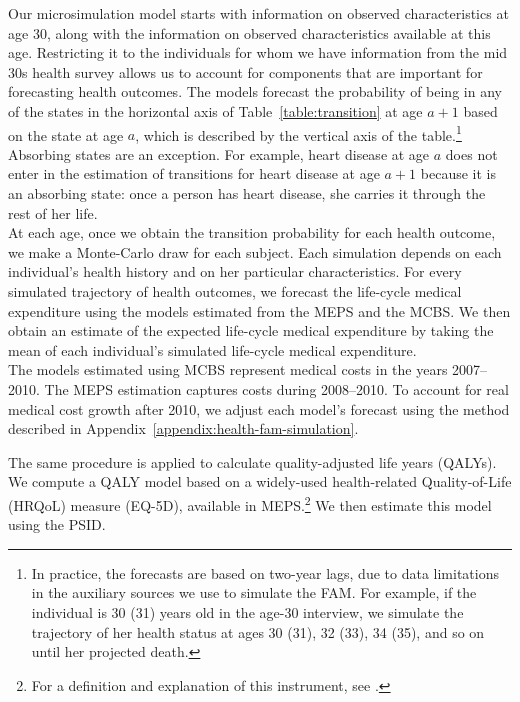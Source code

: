 \noindent Our microsimulation model starts with information on observed characteristics at age 30, along with the information on observed characteristics available at this age. Restricting it to the individuals for whom we have information from the mid 30s health survey allows us to account for components that are important for forecasting health outcomes. The models forecast the probability of being in any of the states in the horizontal axis of Table~\ref{table:transition} at age $a+1$ based on the state at age $a$, which is described by the vertical axis of the table.\footnote{In practice, the forecasts are based on two-year lags, due to data limitations in the auxiliary sources we use to simulate the FAM. For example, if the individual is 30 (31) years old in the age-30 interview, we simulate the trajectory of her health status at ages 30 (31), 32 (33), 34 (35), and so on until her projected death.} Absorbing states are an exception. For example, heart disease at age $a$ does not enter in the estimation of transitions for heart disease at age $a+1$ because it is an absorbing state: once a person has heart disease, she carries it through the rest of her life.\\

\noindent At each age, once we obtain the transition probability for each health outcome, we make a Monte-Carlo draw for each subject. Each simulation depends on each individual's health history and on her particular characteristics. For every simulated trajectory of health outcomes, we forecast the life-cycle medical expenditure using the models estimated from the MEPS and the MCBS. We then obtain an estimate of the expected life-cycle medical expenditure by taking the mean of each individual's simulated life-cycle medical expenditure.\\

\noindent The models estimated using MCBS represent medical costs in the years 2007--2010. The MEPS estimation captures costs during 2008--2010. To account for real medical cost growth after 2010, we adjust each model's forecast using the method described in  Appendix~\ref{appendix:health-fam-simulation}.

\noindent The same procedure is applied to calculate quality-adjusted life years (QALYs). We compute a QALY model based on a widely-used health-related Quality-of-Life (HRQoL) measure (EQ-5D), available in MEPS.\footnote{For a definition and explanation of this instrument, see \citet{Dolan_1997_Modeling_MC,Shaw_etal_2005_EQ5D_MC}.} We then estimate this model using the PSID.\\

